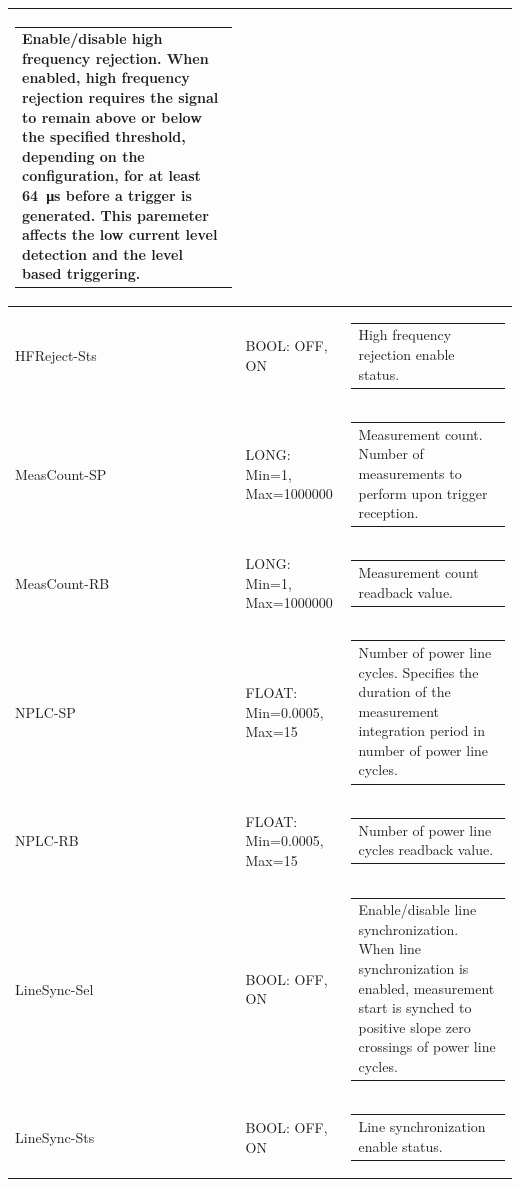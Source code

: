 \documentclass[openany]{article}
\begin{document}
\begin{longtable}{| m{3.0cm} m{4.5cm} m{7.0cm} |}
\begin{tabular}{@{}m{6cm}@{}}
	    					Enable/disable high frequency rejection. When enabled, high frequency rejection requires the signal to remain above or below the specified threshold, depending on the configuration, for at least \SI{64}{\micro\second} before a trigger is generated. This paremeter affects the low current level detection and the level based triggering.
						\end{tabular} \\ \hline
		HFReject-Sts & BOOL: OFF, ON & \begin{tabular}{@{}m{6cm}@{}}
	    					High frequency rejection enable status.
						\end{tabular} \\ \hline
		MeasCount-SP & LONG: Min=1, Max=1000000 & \begin{tabular}{@{}m{6cm}@{}}
	    					Measurement count. Number of measurements to perform upon trigger reception.
						\end{tabular} \\ \hline
		MeasCount-RB & LONG: Min=1, Max=1000000 & \begin{tabular}{@{}m{6cm}@{}}
	    					Measurement count readback value.
						\end{tabular} \\ \hline
		NPLC-SP & FLOAT: Min=0.0005, Max=15 & \begin{tabular}{@{}m{6cm}@{}}
	    					Number of power line cycles. Specifies the duration of the measurement integration period in number of power line cycles.
						\end{tabular} \\ \hline
		NPLC-RB & FLOAT: Min=0.0005, Max=15 & \begin{tabular}{@{}m{6cm}@{}}
	    					Number of power line cycles readback value.
						\end{tabular} \\ \hline
		LineSync-Sel & BOOL: OFF, ON & \begin{tabular}{@{}m{6cm}@{}}
	    					Enable/disable line synchronization. When line synchronization is enabled, measurement start is synched to positive slope zero crossings of power line cycles.
						\end{tabular} \\ \hline
		LineSync-Sts & BOOL: OFF, ON & \begin{tabular}{@{}m{6cm}@{}}
	    					Line synchronization enable status.
						\end{tabular} \\ \hline

\end{longtable}
\end{document}
